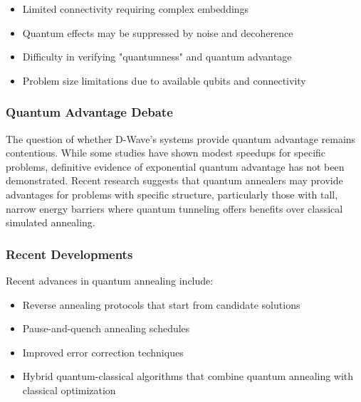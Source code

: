 \begin{itemize}
  \item Limited connectivity requiring complex embeddings
  \item Quantum effects may be suppressed by noise and decoherence
  \item Difficulty in verifying "quantumness" and quantum advantage
  \item Problem size limitations due to available qubits and connectivity
\end{itemize}

\subsubsection*{Quantum Advantage Debate}
The question of whether D-Wave's systems provide quantum advantage remains
contentious. While some studies have shown modest speedups for specific
problems, definitive evidence of exponential quantum advantage has not been
demonstrated. Recent research suggests that quantum annealers may provide
advantages for problems with specific structure, particularly those with
tall, narrow energy barriers where quantum tunneling offers benefits over
classical simulated annealing.

\subsubsection*{Recent Developments}
Recent advances in quantum annealing include:
\begin{itemize}
  \item Reverse annealing protocols that start from candidate solutions
  \item Pause-and-quench annealing schedules
  \item Improved error correction techniques
  \item Hybrid quantum-classical algorithms that combine quantum annealing
    with classical optimization
\end{itemize}


